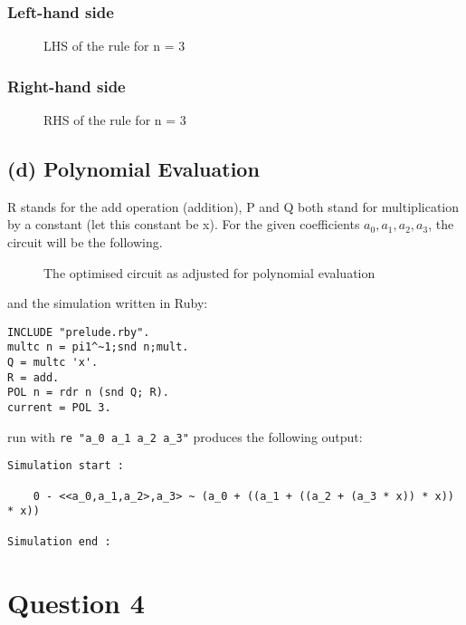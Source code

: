 \documentclass[a4paper,10pt]{article}
\begin{document}
\subsubsection*{Left-hand side}
\begin{figure}[H]
\begin{center}

\caption{LHS of the rule for n = 3}
\end{center}
\end{figure}
\subsubsection*{Right-hand side}
\begin{figure}[H]
\begin{center}

\caption{RHS of the rule for n = 3}
\end{center}
\end{figure}
\subsection*{(d) Polynomial Evaluation}
R stands for the add operation (addition), P and Q both stand for multiplication by a constant (let this constant be x).
For the given coefficients $a_0,a_1,a_2,a_3$, the circuit will be the following.
\begin{figure}[H]
\begin{center}

\caption{The optimised circuit as adjusted for polynomial evaluation}
\end{center}
\end{figure}
and the simulation written in Ruby:
\begin{Verbatim}
INCLUDE "prelude.rby".
multc n = pi1^~1;snd n;mult.
Q = multc 'x'.
R = add.
POL n = rdr n (snd Q; R).
current = POL 3.
\end{Verbatim}
run with \verb|re "a_0 a_1 a_2 a_3"| produces the following output:
\begin{Verbatim}
Simulation start :

    0 - <<a_0,a_1,a_2>,a_3> ~ (a_0 + ((a_1 + ((a_2 + (a_3 * x)) * x)) * x))

Simulation end :
\end{Verbatim}
\section*{Question 4}
\end{document}
